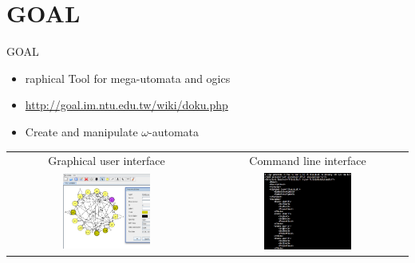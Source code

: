 \documentclass[12pt,handout]{beamer}
\begin{document}
\section{GOAL}
\begin{frame}{GOAL}
\begin{itemize}
\item {}raphical Tool for mega-utomata and ogics
\item \url{http://goal.im.ntu.edu.tw/wiki/doku.php}
\item Create and manipulate $\omega$-automata
\end{itemize}
\centering
\begin{tabular}{cc}
\footnotesize Graphical user interface & \footnotesize Command line interface \\
\includegraphics[width=0.46\textwidth,trim={0 2cm 0 0},clip]
{figures/goal_gui.png} &
\includegraphics[width=0.46\textwidth,trim={0 2cm 0 0},clip]
{figures/goal_cl.png}
\end{tabular}
\end{frame}
\end{document}
